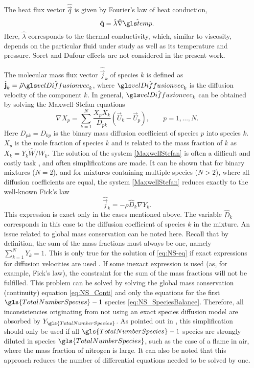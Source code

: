 The heat flux vector $\hat{\vec{q}}$ is given by Fourier's law of heat conduction,
\begin{equation}
	\hat{\vec{q}} = \hat \lambda \hat{\nabla} \glsHat{temp}.
	\label{eq:fourierLaw}
\end{equation}
Here, $\hat \lambda$ corresponds to the thermal conductivity, which, similar to viscosity, depends on the particular fluid under study as well as its temperature and pressure. Soret and Dufour effects are not considered in the present work.

The molecular mass flux vector $\hat{\vec{j}}_k$ of species $k$ is defined as $ \hat{\vec{j}}_k = \hat \rho \glsHat{velDiffusionvec}_k$, where $\glsHat{velDiffusionvec}_k$ is the diffusion velocity of the component $k$. In general, $\glsHat{velDiffusionvec}_k$ can be obtained by solving the Maxwell-Stefan equations
\begin{equation}
	\nabla X_p = \sum_{k=1}^{N}\frac{X_p X_k}{D_{pk}}(\vec{U}_k-\vec{U}_p), \qquad p = 1,\dots,N. \label{MaxwellStefan}
\end{equation}
Here $D_{pk} = D_{kp}$ is the binary mass diffusion coefficient of species $p$ into species $k$. $X_p$ is the mole fraction of species $k$ and is related to the mass fraction of $k$ as $ X_k = Y_k \hat W /\hat W_k$.
The solution of the system \eqref{MaxwellStefan} is often a difficult and costly task \parencite{williamsCombustionTheoryFundamental2000,poinsotTheoreticalNumericalCombustion2005}, and often simplifications are made. It can be shown that for binary mixtures ($N = 2$), and for mixtures containing multiple species ($N>2$), where all diffusion coefficients are equal, the system \eqref{MaxwellStefan} reduces exactly to the well-known Fick's law
\begin{equation}
	\hat{\vec{j}}_k = -\rho \hat D_k \nabla Y_k.
\end{equation}\label{eq:FickLaw}
This expression is exact only in the cases mentioned above. The variable $\hat D_k$ corresponds in this case to the diffusion coefficient of species $k$ in the mixture. An issue related to global mass conservation can be noted here. Recall that by definition, the sum of the mass fractions must always be one, namely $ \sum_{k=1}^{N}Y_k = 1$. This is only true for the solution of \cref{eq:NS-eq} if exact expressions for diffusion velocities are used \parencite{poinsotTheoreticalNumericalCombustion2005}. If some inexact expression is used (as, for example, Fick's law), the constraint for the sum of the mass fractions will not be fulfilled. This problem can be solved by solving the global mass conservation (continuity) equation \cref{eq:NS_Conti} and only the equations for the first $\gls{TotalNumberSpecies} - 1$ species \cref{eq:NS_SpeciesBalance}.
Therefore, all inconsistencies originating from not using an exact species diffusion model are absorbed by $Y_{\gls{TotalNumberSpecies}}$. As pointed out in \textcite{poinsotTheoreticalNumericalCombustion2005}, this simplification should only be used if all $\gls{TotalNumberSpecies}-1$ species are strongly diluted in species $\gls{TotalNumberSpecies}$, such as the case of a flame in air, where the mass fraction of nitrogen is large. It can also be noted that this approach reduces the number of differential equations needed to be solved by one.

